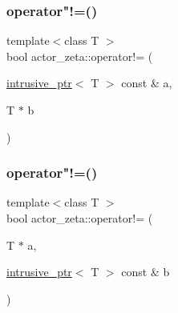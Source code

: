 \mbox{\label{namespaceactor__zeta_a37a83c975b21ae711afbc79899f65ce5}} 
\subsubsection{\texorpdfstring{operator"!=()}{operator!=()}\hspace{0.1cm}{\footnotesize\ttfamily [2/3]}}
{\footnotesize\ttfamily template$<$class T $>$ \\
bool actor\+\_\+zeta\+::operator!= (\begin{DoxyParamCaption}\item[{\hyperlink{classactor__zeta_1_1intrusive__ptr}{intrusive\+\_\+ptr}$<$ T $>$ const \&}]{a,  }\item[{T $\ast$}]{b }\end{DoxyParamCaption})\hspace{0.3cm}{\ttfamily [noexcept]}}

\mbox{\label{namespaceactor__zeta_a77e38cafe133e9e6ddecab74c92ee0d7}} 
\subsubsection{\texorpdfstring{operator"!=()}{operator!=()}\hspace{0.1cm}{\footnotesize\ttfamily [3/3]}}
{\footnotesize\ttfamily template$<$class T $>$ \\
bool actor\+\_\+zeta\+::operator!= (\begin{DoxyParamCaption}\item[{T $\ast$}]{a,  }\item[{\hyperlink{classactor__zeta_1_1intrusive__ptr}{intrusive\+\_\+ptr}$<$ T $>$ const \&}]{b }\end{DoxyParamCaption})\hspace{0.3cm}{\ttfamily [noexcept]}}

\mbox{\label{namespaceactor__zeta_ad575198e737479f03575c22928499605}} 
